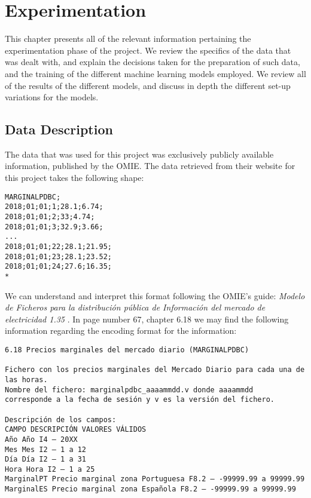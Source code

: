 \documentclass[12pt]{report} %
\begin{document}
\chapter{Experimentation}
This chapter presents all of the relevant information pertaining the experimentation phase of the project. We review the specifics of the data that was dealt with, and explain the decisions taken for the preparation of such data, and the training of the different machine learning models employed. We review all of the results of the different models, and discuss in depth the different set-up variations for the models.


\section{Data Description} %
The data that was used for this project was exclusively publicly available information, published by the OMIE. The data retrieved from their website \cite{omie_datos} for this project takes the following shape:

\begin{small}
\begin{verbatim}
MARGINALPDBC;
2018;01;01;1;28.1;6.74;
2018;01;01;2;33;4.74;
2018;01;01;3;32.9;3.66;
...
2018;01;01;22;28.1;21.95;
2018;01;01;23;28.1;23.52;
2018;01;01;24;27.6;16.35;
*
\end{verbatim}
\end{small}

We can understand and interpret this format following the OMIE's guide: \textit{Modelo de Ficheros para la distribución pública de Información del mercado de electricidad 1.35} \cite{omie_formatos_2024}. In page number 67, chapter 6.18 we may find the following information regarding the encoding format for the information:

\begin{small} %
\begin{verbatim}
6.18 Precios marginales del mercado diario (MARGINALPDBC)

Fichero con los precios marginales del Mercado Diario para cada una de
las horas.
Nombre del fichero: marginalpdbc_aaaammdd.v donde aaaammdd
corresponde a la fecha de sesión y v es la versión del fichero.

Descripción de los campos:
CAMPO DESCRIPCIÓN VALORES VÁLIDOS
Año Año I4 – 20XX
Mes Mes I2 – 1 a 12
Día Día I2 – 1 a 31
Hora Hora I2 – 1 a 25
MarginalPT Precio marginal zona Portuguesa F8.2 – -99999.99 a 99999.99
MarginalES Precio marginal zona Española F8.2 – -99999.99 a 99999.99
\end{verbatim}
\end{small}
\end{document}

